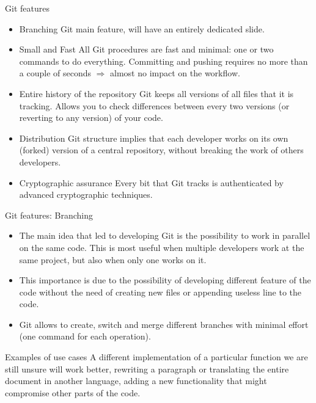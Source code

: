 \documentclass{beamer}
\newcommand{\git}{Git{}}
\begin{document}
\begin{frame}{\git{} features}
    \begin{itemize}
        \item \alert{Branching} \git{} main feature, will have an entirely dedicated slide.
        \item \alert{Small and Fast} All \git{} procedures are fast and minimal: one or two commands to do everything. Committing and pushing requires no more than a couple of seconds $\Rightarrow$ almost no impact on the workflow.
        \item \alert{Entire history of the repository} \git{} keeps all versions of all files that it is tracking. Allows you to check differences between every two versions (or reverting to any version) of your code.
        \item \alert{Distribution} \git{} structure implies that each developer works on its own (forked) version of a central repository, without breaking the work of others developers.
        \item \alert{Cryptographic assurance} Every bit that \git{} tracks is authenticated by advanced cryptographic techniques.
    \end{itemize}
\end{frame}

\begin{frame}{\git{} features: Branching}
    \begin{itemize}
    \item The main idea that led to developing \git{} is the possibility to \alert{work in parallel} on the same code. This is most useful when multiple developers work at the same project, but also when only one works on it.
    
    \item This importance is due to the possibility of \alert{developing different feature} of the code without the need of creating new files or appending useless line to the code. 
    
    \item \git{} allows to \alert{create}, \alert{switch} and \alert{merge} different branches with minimal effort (one command for each operation).
    \end{itemize}
    \begin{block}{Examples of use cases}
        A different implementation of a particular function we are still unsure will work better, rewriting a paragraph or translating the entire document in another language, adding a new functionality that might compromise other parts of the code.
    \end{block}
\end{frame}
\end{document}
